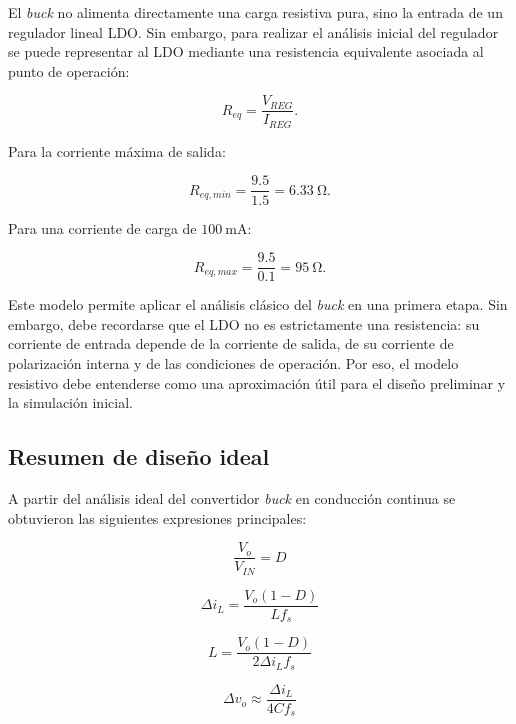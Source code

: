 \documentclass[a4paper,12pt]{article}
\begin{document}
El \textit{buck} no alimenta directamente una carga resistiva pura, sino la entrada de un regulador lineal LDO. Sin embargo, para realizar el análisis inicial del regulador se puede representar al LDO mediante una resistencia equivalente asociada al punto de operación:

\begin{equation}
    R_{eq} = \frac{V_{REG}}{I_{REG}}.
\end{equation}

Para la corriente máxima de salida:

\begin{equation}
    R_{eq,min} = \frac{9.5}{1.5} = 6.33\ \si{\ohm}.
\end{equation}

Para una corriente de carga de $100\ \si{\milli\ampere}$:

\begin{equation}
    R_{eq,max} = \frac{9.5}{0.1} = 95\ \si{\ohm}.
\end{equation}

Este modelo permite aplicar el análisis clásico del \textit{buck} en una primera etapa. Sin embargo, debe recordarse que el LDO no es estrictamente una resistencia: su corriente de entrada depende de la corriente de salida, de su corriente de polarización interna y de las condiciones de operación. Por eso, el modelo resistivo debe entenderse como una aproximación útil para el diseño preliminar y la simulación inicial.

\subsection{Resumen de diseño ideal}

A partir del análisis ideal del convertidor \textit{buck} en conducción continua se obtuvieron las siguientes expresiones principales:

\begin{equation}
    \frac{V_o}{V_{IN}} = D
\end{equation}

\begin{equation}
    \Delta i_L = \frac{V_o(1-D)}{L f_s}
\end{equation}

\begin{equation}
    L = \frac{V_o(1-D)}{2 \Delta i_L f_s}
\end{equation}

\begin{equation}
    \Delta v_o \approx \frac{\Delta i_L}{4 C f_s}
\end{equation}
\end{document}
